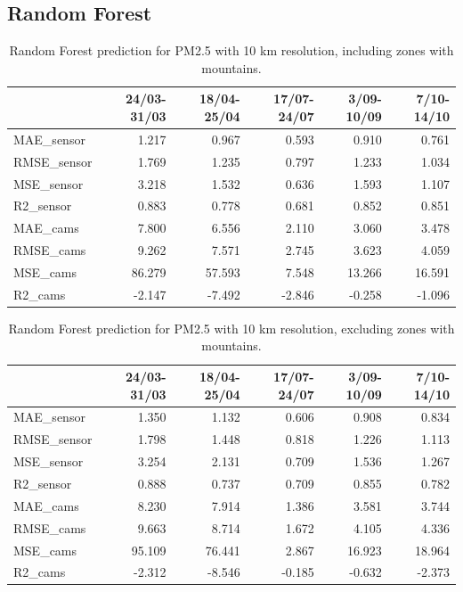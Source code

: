 \subsection{Random Forest}
\begin{table}[H]
\begin{tabular}{lrrrrr}
\toprule
 &  24/03-31/03 &  18/04-25/04 &  17/07-24/07 &  3/09-10/09 &  7/10-14/10 \\
\midrule
 MAE\_sensor &        1.217 &        0.967 &        0.593 &       0.910 &       0.761 \\
RMSE\_sensor &        1.769 &        1.235 &        0.797 &       1.233 &       1.034 \\
 MSE\_sensor &        3.218 &        1.532 &        0.636 &       1.593 &       1.107 \\
  R2\_sensor &        0.883 &        0.778 &        0.681 &       0.852 &       0.851 \\
   MAE\_cams &        7.800 &        6.556 &        2.110 &       3.060 &       3.478 \\
  RMSE\_cams &        9.262 &        7.571 &        2.745 &       3.623 &       4.059 \\
   MSE\_cams &       86.279 &       57.593 &        7.548 &      13.266 &      16.591 \\
    R2\_cams &       -2.147 &       -7.492 &       -2.846 &      -0.258 &      -1.096 \\
\bottomrule
\end{tabular}
\caption{Random Forest prediction for PM2.5 with 10 km resolution, including zones with mountains.}
\end{table}
\bigskip
\begin{table}[H]
\begin{tabular}{lrrrrr}
\toprule
 &  24/03-31/03 &  18/04-25/04 &  17/07-24/07 &  3/09-10/09 &  7/10-14/10 \\
\midrule
 MAE\_sensor &        1.350 &        1.132 &        0.606 &       0.908 &       0.834 \\
RMSE\_sensor &        1.798 &        1.448 &        0.818 &       1.226 &       1.113 \\
 MSE\_sensor &        3.254 &        2.131 &        0.709 &       1.536 &       1.267 \\
  R2\_sensor &        0.888 &        0.737 &        0.709 &       0.855 &       0.782 \\
   MAE\_cams &        8.230 &        7.914 &        1.386 &       3.581 &       3.744 \\
  RMSE\_cams &        9.663 &        8.714 &        1.672 &       4.105 &       4.336 \\
   MSE\_cams &       95.109 &       76.441 &        2.867 &      16.923 &      18.964 \\
    R2\_cams &       -2.312 &       -8.546 &       -0.185 &      -0.632 &      -2.373 \\
\bottomrule
\end{tabular}
\caption{Random Forest prediction for PM2.5 with 10 km resolution, excluding zones with mountains.}
\end{table}
